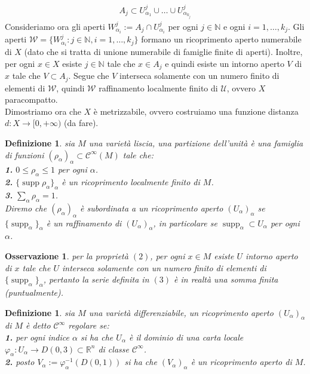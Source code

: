 \documentclass[oneside, 11pt]{amsbook}
\makeatletter
\newcommand{\C}{\mathcal{C}}
\newcommand{\U}{\mathcal{U}}
\newcommand{\W}{\mathcal{W}}
\newcommand{\R}{\mathbb{R}}
\newcommand{\vp}{\varphi}
\newcommand{\co}[1]{\textit{#1}}
\newcommand{\gr}[1]{\textbf{#1}}
\newcommand{\N}{{\mathbb N}}
\newcommand{\0}{{(0)}}
\newcommand{\3}{{(3)}}
\theoremstyle{colonplain}
\theoremstyle{colondefinition}
\newtheorem{defn}[thm]{Definizione}
\theoremstyle{colonremark}
\newtheorem{rmk}[thm]{Osservazione}
\numberwithin{equation}{chapter}
\renewcommand{\proofname}{Dimostrazione}
\renewenvironment{proof}[1][\proofname]{\par
  \pushQED{\qed}%
  \normalfont \topsep6\p@\@plus6\p@\relax
  \trivlist
  \item[\hskip\labelsep\bfseries #1:]\ignorespaces
}{%
  \popQED\endtrivlist\@endpefalse
}
\makeatother
\begin{document}
\begin{proof}
    \begin{align}
        A_j \subset U^j_{\alpha_1} \cup \dots \cup U^j_{\alpha_{k_j}}
    \end{align}
    Consideriamo ora gli aperti $W^j_{\alpha_i} := A_j \cap U^j_{\alpha_i}$ per ogni $j \in \N$ e ogni $i = 1, \dots, k_j$. Gli aperti $\W = \{W^j_{\alpha_i} : j \in \N, i = 1, \dots, k_j\}$ formano un ricoprimento aperto numerabile di $X$ (dato che si tratta di unione numerabile di famiglie finite di aperti). Inoltre, per ogni $x \in X$ esiste $j \in \N$ tale che $x \in A_j$ e quindi esiste un intorno aperto $V$ di $x$ tale che $V \subset A_j$. Segue che $V$ interseca solamente con un numero finito di elementi di $\W$, quindi $\W$ raffinamento localmente finito di $\U$, ovvero $X$ paracompatto. \\
    Dimostriamo ora che $X$ è metrizzabile, ovvero costruiamo una funzione distanza $d : X \longrightarrow [0, +\infty)$ (da fare).
\end{proof}
\begin{defn}
    sia $M$ una varietà liscia, una \co{partizione dell'unità} è una famiglia di funzioni $(\rho_\alpha)_\alpha \subset \C^\infty(M)$ tale che: \\
    \gr{1.} $0 \leq \rho_\alpha \leq 1$ per ogni $\alpha$. \\
    \gr{2.} $\{\operatorname{supp} \rho_\alpha\}_\alpha$ è un ricoprimento localmente finito di $M$. \\
    \gr{3.} $\sum_\alpha \rho_\alpha = 1$. \\
    Diremo che $(\rho_\alpha)_\alpha$ è \co{subordinata} a un ricoprimento aperto $(U_\alpha)_\alpha$ se $\{\operatorname{supp}_\alpha\}_\alpha$ è un raffinamento di $(U_\alpha)_\alpha$, in particolare se $\operatorname{supp}_\alpha \subset U_\alpha$ per ogni $\alpha$.
\end{defn}
\begin{rmk}
    per la proprietà $(2)$, per ogni $x \in M$ esiste $U$ intorno aperto di $x$ tale che $U$ interseca solamente con un numero finito di elementi di $\{\operatorname{supp}_\alpha\}_\alpha$, pertanto la serie definita in $(3)$ è in realtà una somma finita (puntualmente). 
\end{rmk}
\begin{defn}
    sia $M$ una varietà differenziabile, un ricoprimento aperto $(U_\alpha)_\alpha$ di $M$ è detto $\C^\infty$ \co{regolare} se: \\
    \gr{1.} per ogni indice $\alpha$ si ha che $U_\alpha$ è il dominio di una carta locale $\vp_\alpha : U_\alpha \longrightarrow D(0, 3) \subset \R^n$ di classe $\C^\infty$. \\
    \gr{2.} posto $V_\alpha := \vp^{-1}_\alpha(D(0, 1))$ si ha che $(V_\alpha)_\alpha$ è un ricoprimento aperto di $M$.
\end{defn}
\end{document}
